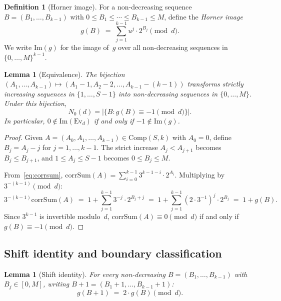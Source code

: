 \documentclass[12pt, a4paper]{amsart}
\theoremstyle{plain}
\newtheorem{lemma}[theorem]{Lemma}
\theoremstyle{definition}
\newtheorem{definition}[theorem]{Definition}
\theoremstyle{remark}
\newcommand{\Comp}{\mathrm{Comp}}
\newcommand{\Ev}{\mathrm{Ev}}
\newcommand{\corrSum}{\mathrm{corrSum}}
\begin{document}
\begin{definition}[Horner image]\label{def:gB}
  For a non-decreasing sequence
  $B = (B_1, \ldots, B_{k-1})$ with
  $0 \leq B_1 \leq \cdots \leq B_{k-1} \leq M$, define
  the \emph{Horner image}
  \[
    g(B) \;=\; \sum_{j=1}^{k-1} u^j \cdot 2^{B_j}
    \pmod{d}.
  \]
  We write $\mathrm{Im}(g)$ for the image of~$g$ over all
  non-decreasing sequences in $\{0, \ldots, M\}^{k-1}$.
\end{definition}

\begin{lemma}[Equivalence]\label{lem:horner-equiv}
  The bijection $(A_1, \ldots, A_{k-1}) \mapsto
  (A_1 - 1, A_2 - 2, \ldots, A_{k-1} - (k-1))$ transforms
  strictly increasing sequences in $\{1, \ldots, S-1\}$ into
  non-decreasing sequences in $\{0, \ldots, M\}$.
  Under this bijection,
  \[
    N_0(d)
    = \bigl|\{B : g(B) \equiv -1 \pmod{d}\}\bigr|.
  \]
  In particular, $0 \notin \mathrm{Im}(\Ev_d)$
  if and only if $-1 \notin \mathrm{Im}(g)$.
\end{lemma}

\begin{proof}
  Given $A = (A_0, A_1, \ldots, A_{k-1}) \in \Comp(S,k)$ with
  $A_0 = 0$, define $B_j = A_j - j$ for $j = 1, \ldots, k-1$.
  The strict increase $A_j < A_{j+1}$ becomes
  $B_j \leq B_{j+1}$, and $1 \leq A_j \leq S-1$ becomes
  $0 \leq B_j \leq M$.

  From~\eqref{eq:corrsum},
  $\corrSum(A) = \sum_{i=0}^{k-1} 3^{k-1-i} \cdot 2^{A_i}$.
  Multiplying by $3^{-(k-1)} \pmod{d}$:
  \[
    3^{-(k-1)} \corrSum(A)
    \;=\; 1 + \sum_{j=1}^{k-1}
    3^{-j} \cdot 2^{B_j + j}
    \;=\; 1 + \sum_{j=1}^{k-1}
    (2 \cdot 3^{-1})^j \cdot 2^{B_j}
    \;=\; 1 + g(B).
  \]
  Since $3^{k-1}$ is invertible modulo~$d$,
  $\corrSum(A) \equiv 0 \pmod{d}$ if and only if
  $g(B) \equiv -1 \pmod{d}$.
\end{proof}

\subsection{Shift identity and boundary classification}%
\label{ssec:four-cases}

\begin{lemma}[Shift identity]\label{lem:shift}
  For every non-decreasing $B = (B_1, \ldots, B_{k-1})$
  with $B_j \in [0, M]$, writing
  $B + 1 = (B_1 + 1, \ldots, B_{k-1} + 1)$:
  \[
    g(B + 1) \;=\; 2 \cdot g(B) \pmod{d}.
  \]
\end{lemma}
\end{document}
